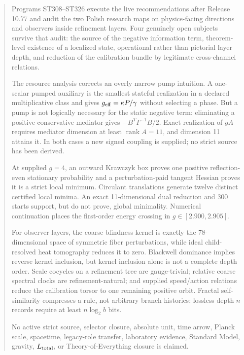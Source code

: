 \documentclass[11pt,a4paper]{article}
\begin{document}
\begin{abstract}
Programs ST308--ST326 execute the live recommendations after Release 10.77 and audit the
two Polish research maps on physics-facing directions and observers inside refinement
layers. Four genuinely open subjects survive that audit: the source of the negative
information term, theorem-level existence of a localized state, operational rather than
pictorial layer depth, and reduction of the calibration bundle by legitimate cross-channel
relations.

The resource analysis corrects an overly narrow pump intuition. A one-scalar pumped
auxiliary is the smallest stateful realization in a declared multiplicative class and gives
$g_{\rm eff}=\kappa P/\gamma$ without selecting a phase. But a pump is not logically
necessary for the static negative term: eliminating a positive conservative mediator gives
$-B^T\Gamma^{-1}B/2$. Exact realization of $gA$ requires mediator dimension at least
$\operatorname{rank}A=11$, and dimension 11 attains it. In both cases a new signed coupling
is supplied; no strict source has been derived.

At supplied $g=4$, an outward Krawczyk box proves one positive reflection-even stationary
probability and a perturbation-paid tangent Hessian proves it is a strict local minimum.
Circulant translations generate twelve distinct certified local minima. An exact
11-dimensional dual reduction and 300 starts support, but do not prove, global minimality.
Numerical continuation places the first-order energy crossing in $g\in[2.900,2.905]$.

For observer layers, the coarse blindness kernel is exactly the 78-dimensional space of
symmetric fiber perturbations, while ideal child-resolved heat tomography reduces it to
zero. Blackwell dominance implies reverse kernel inclusion, but kernel inclusion alone is
not a complete depth order. Scale cocycles on a refinement tree are gauge-trivial;
relative coarse spectral clocks are refinement-natural; and supplied speed/action
relations reduce the calibration torsor to one remaining positive orbit. Fractal
self-similarity compresses a rule, not arbitrary branch histories: lossless depth-$n$
records require at least $n\log_2b$ bits.

No active strict source, selector closure, absolute unit, time arrow, Planck scale,
spacetime, legacy-role transfer, laboratory evidence, Standard Model, gravity,
$L_{\rm total}$, or Theory-of-Everything closure is claimed.
\end{abstract}
\tableofcontents\newpage{}
\end{document}
